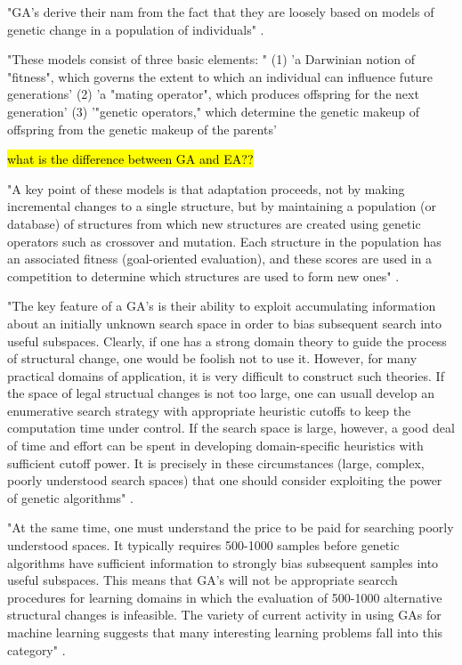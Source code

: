 "GA's derive their nam from the fact that they are loosely based on models of genetic change in a population of individuals" \cite{de1988learning}.

"These models consist of three basic elements: " \cite{de1988learning}
(1) 'a Darwinian notion of "fitness", which governs the extent to which an individual can influence future generations'
(2) 'a "mating operator", which produces offspring for the next generation'
(3) '"genetic operators," which determine the genetic makeup of offspring from the genetic makeup of the parents'

\hl{what is the difference between GA and EA??}

"A key point of these models is that adaptation proceeds, not by making incremental changes to a single structure, but by maintaining a population (or database) of structures from which new structures are created using genetic operators such as crossover and mutation. Each structure in the population has an associated fitness (goal-oriented evaluation), and these scores are used in a competition to determine which structures are used to form new ones" \cite{de1988learning}.

"The key feature of a GA's is their ability to exploit accumulating information about an initially unknown search space in order to bias subsequent search into useful subspaces. Clearly, if one has a strong domain theory to guide the process of structural change, one would be foolish not to use it. However, for many practical domains of application, it is very difficult to construct such theories. If the space of legal structual changes is not too large, one can usuall develop an enumerative search strategy with appropriate heuristic cutoffs to keep the computation time under control. If the search space is large, however, a good deal of time and effort can be spent in developing domain-specific heuristics with sufficient cutoff power. It is precisely in these circumstances (large, complex, poorly understood search spaces) that one should consider exploiting the power of genetic algorithms" \cite{de1988learning}.

"At the same time, one must understand the price to be paid for searching poorly understood spaces. It typically requires 500-1000 samples before genetic algorithms have sufficient information to strongly bias subsequent samples into useful subspaces. This means that GA's will not be appropriate searcch procedures for learning domains in which the evaluation of 500-1000 alternative structural changes is infeasible. The variety of current activity in using GAs for machine learning suggests that many interesting learning problems fall into this category" \cite{de1988learning}.

